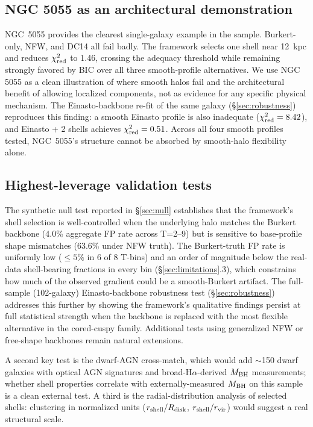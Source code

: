 \subsection{NGC 5055 as an architectural demonstration}

NGC~5055 provides the clearest single-galaxy example in the sample. Burkert-only, NFW, and DC14 all fail badly. The framework selects one shell near 12~kpc and reduces $\chi^2_{\rm red}$ to 1.46, crossing the adequacy threshold while remaining strongly favored by BIC over all three smooth-profile alternatives. We use NGC 5055 as a clean illustration of where smooth halos fail and the architectural benefit of allowing localized components, not as evidence for any specific physical mechanism. The Einasto-backbone re-fit of the same galaxy (\S\ref{sec:robustness}) reproduces this finding: a smooth Einasto profile is also inadequate ($\chi^2_{\rm red} = 8.42$), and Einasto + 2 shells achieves $\chi^2_{\rm red} = 0.51$. Across all four smooth profiles tested, NGC~5055's structure cannot be absorbed by smooth-halo flexibility alone.

\subsection{Highest-leverage validation tests}

The synthetic null test reported in \S\ref{sec:null} establishes that the framework's shell selection is well-controlled when the underlying halo matches the Burkert backbone (4.0\% aggregate FP rate across T=2--9) but is sensitive to base-profile shape mismatches (63.6\% under NFW truth). The Burkert-truth FP rate is uniformly low ($\leq 5\%$ in 6 of 8 T-bins) and an order of magnitude below the real-data shell-bearing fractions in every bin (\S\ref{sec:limitations}.3), which constrains how much of the observed gradient could be a smooth-Burkert artifact. The full-sample (102-galaxy) Einasto-backbone robustness test (\S\ref{sec:robustness}) addresses this further by showing the framework's qualitative findings persist at full statistical strength when the backbone is replaced with the most flexible alternative in the cored-cuspy family. Additional tests using generalized NFW or free-shape backbones remain natural extensions.

A second key test is the \citet{ReinesGreeneGeha2013} dwarf-AGN cross-match, which would add $\sim$150 dwarf galaxies with optical AGN signatures and broad-H$\alpha$-derived $M_{\rm BH}$ measurements; whether shell properties correlate with externally-measured $M_{\rm BH}$ on this sample is a clean external test. A third is the radial-distribution analysis of selected shells: clustering in normalized units ($r_{\rm shell}/R_{\rm disk}$, $r_{\rm shell}/r_{\rm vir}$) would suggest a real structural scale.

